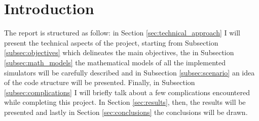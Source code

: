 \section{Introduction} %
\label{sec:introduction}

The report is structured as follow: in Section \ref{sec:technical_approach} I will present the technical aspects of the project, starting from Subsection \ref{subsec:objectives} which delineates the main objectives, the in Subsection \ref{subsec:math_models} the mathematical models of all the implemented simulators will be carefully described and in Subsection \ref{subsec:scenario} an idea of the code structure will be presented. Finally, in Subsection \ref{subsec:complications} I will briefly talk about a few complications encountered while completing this project. In Section \ref{sec:results}, then, the results will be presented and lastly in Section \ref{sec:conclusions} the conclusions will be drawn.